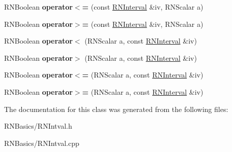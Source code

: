 \begin{DoxyCompactItemize}
\item 
R\+N\+Boolean {\bfseries operator$<$=} (const \hyperlink{class_r_n_interval}{R\+N\+Interval} \&iv, R\+N\+Scalar a)\hypertarget{class_r_n_interval_a5a5dc8e7c0c5a5c503b19f87196af84f}{}\label{class_r_n_interval_a5a5dc8e7c0c5a5c503b19f87196af84f}

\item 
R\+N\+Boolean {\bfseries operator$>$=} (const \hyperlink{class_r_n_interval}{R\+N\+Interval} \&iv, R\+N\+Scalar a)\hypertarget{class_r_n_interval_a698bd4c7a4cb31b7264efe5eb7078b34}{}\label{class_r_n_interval_a698bd4c7a4cb31b7264efe5eb7078b34}

\item 
R\+N\+Boolean {\bfseries operator$<$} (R\+N\+Scalar a, const \hyperlink{class_r_n_interval}{R\+N\+Interval} \&iv)\hypertarget{class_r_n_interval_a37a4c06afbf8ba452482ce87b4cd3c6b}{}\label{class_r_n_interval_a37a4c06afbf8ba452482ce87b4cd3c6b}

\item 
R\+N\+Boolean {\bfseries operator$>$} (R\+N\+Scalar a, const \hyperlink{class_r_n_interval}{R\+N\+Interval} \&iv)\hypertarget{class_r_n_interval_a3d5ac8d17d78d8c612bb4bbffb1e2867}{}\label{class_r_n_interval_a3d5ac8d17d78d8c612bb4bbffb1e2867}

\item 
R\+N\+Boolean {\bfseries operator$<$=} (R\+N\+Scalar a, const \hyperlink{class_r_n_interval}{R\+N\+Interval} \&iv)\hypertarget{class_r_n_interval_a49a5ad0e94fb7a1a2e6374cde869a820}{}\label{class_r_n_interval_a49a5ad0e94fb7a1a2e6374cde869a820}

\item 
R\+N\+Boolean {\bfseries operator$>$=} (R\+N\+Scalar a, const \hyperlink{class_r_n_interval}{R\+N\+Interval} \&iv)\hypertarget{class_r_n_interval_af15135e12034a7f2cb5d1d2d716685bd}{}\label{class_r_n_interval_af15135e12034a7f2cb5d1d2d716685bd}

\end{DoxyCompactItemize}


The documentation for this class was generated from the following files\+:\begin{DoxyCompactItemize}
\item 
R\+N\+Basics/R\+N\+Intval.\+h\item 
R\+N\+Basics/R\+N\+Intval.\+cpp\end{DoxyCompactItemize}
